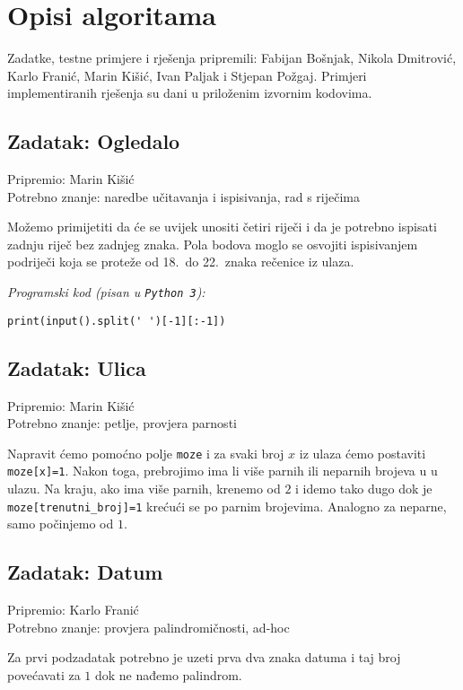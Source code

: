 \documentclass[a4paper]{article}
\begin{document}
\section*{Opisi algoritama}
Zadatke, testne primjere i rješenja pripremili: Fabijan Bošnjak, Nikola
Dmitrović, Karlo Franić, Marin Kišić, Ivan Paljak i Stjepan Požgaj.  Primjeri
implementiranih rješenja su dani u priloženim izvornim kodovima.

\subsection*{Zadatak: Ogledalo}
\textsf{Pripremio: Marin Kišić}\\
\textsf{Potrebno znanje: naredbe učitavanja i ispisivanja, rad s riječima}

Možemo primijetiti da će se uvijek unositi četiri riječi i da je potrebno
ispisati zadnju riječ bez zadnjeg znaka. Pola bodova moglo se osvojiti
ispisivanjem podriječi koja se proteže od 18.\ do 22.\ znaka rečenice iz ulaza.

\textit{Programski kod (pisan u \texttt{Python 3}):}

\vspace{-2ex}
\begin{verbatim}
print(input().split(' ')[-1][:-1])
\end{verbatim}

\subsection*{Zadatak: Ulica}
\textsf{Pripremio: Marin Kišić}\\
\textsf{Potrebno znanje: petlje, provjera parnosti}

Napravit ćemo pomoćno polje \texttt{moze} i za svaki broj $x$ iz ulaza ćemo
postaviti \texttt{moze[x]=1}. Nakon toga, prebrojimo ima li više parnih ili
neparnih brojeva u u ulazu. Na kraju, ako ima više parnih, krenemo od $2$ i
idemo tako dugo dok je \texttt{moze[trenutni\_broj]=1} krećući se po parnim
brojevima. Analogno za neparne, samo počinjemo od $1$.

\subsection*{Zadatak: Datum}
\textsf{Pripremio: Karlo Franić}\\
\textsf{Potrebno znanje: provjera palindromičnosti, ad-hoc}

Za prvi podzadatak potrebno je uzeti prva dva znaka datuma i taj broj
povećavati za $1$ dok ne nađemo palindrom.
\end{document}
